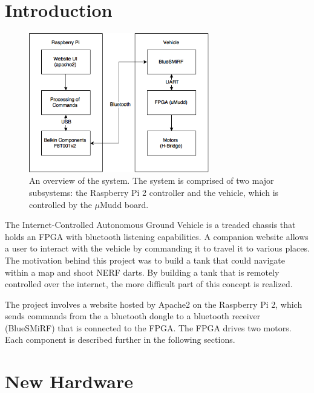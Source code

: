 \documentclass[12pt]{article}
\begin{document}
%

\newpage

\tableofcontents

\newpage


\section{Introduction}

\begin{figure}[b!]
\begin{center}
\includegraphics[width=0.7\textwidth]{E155System}
\end{center}
\caption{An overview of the system. The system is comprised of two major subsystems: the Raspberry Pi 2 controller and the vehicle, which is controlled by the $\mu$Mudd board.}
\label{fig:sys}
\end{figure}

The Internet-Controlled Autonomous Ground Vehicle is a treaded chassis that holds an FPGA with bluetooth listening capabilities. A companion website allows a user to interact with the vehicle by commanding it to travel it to various places. The motivation behind this project was to build a tank that could navigate within a map and shoot NERF darts. By building a tank that is remotely controlled over the internet, the more difficult part of this concept is realized.

The project involves a website hosted by Apache2 on the Raspberry Pi 2, which sends commands from the a bluetooth dongle to a bluetooth receiver (BlueSMiRF) that is connected to the FPGA. The FPGA drives two motors. Each component is described further in the following sections.

\section{New Hardware}
\end{document}
